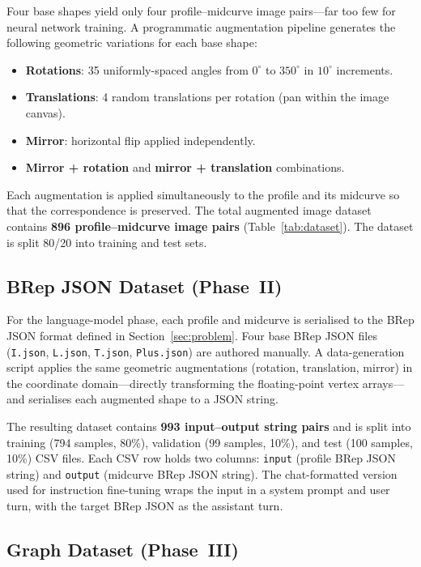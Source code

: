 \documentclass[journal]{IEEEtran}
\begin{document}
Four base shapes yield only four profile--midcurve image pairs—far too few for
neural network training.  A programmatic augmentation pipeline generates the
following geometric variations for each base shape:
\begin{itemize}
  \item \textbf{Rotations}: 35 uniformly-spaced angles from $0^\circ$ to $350^\circ$ in
        $10^\circ$ increments.
  \item \textbf{Translations}: 4 random translations per rotation (pan within
        the image canvas).
  \item \textbf{Mirror}: horizontal flip applied independently.
  \item \textbf{Mirror + rotation} and \textbf{mirror + translation}
        combinations.
\end{itemize}
Each augmentation is applied simultaneously to the profile and its midcurve
so that the correspondence is preserved.  The total augmented image dataset
contains \textbf{896 profile--midcurve image pairs} (Table~\ref{tab:dataset}).
The dataset is split 80/20 into training and test sets.

\subsection{BRep JSON Dataset (Phase~II)}

For the language-model phase, each profile and midcurve is serialised to the
BRep JSON format defined in Section~\ref{sec:problem}.  Four base BRep JSON
files (\texttt{I.json}, \texttt{L.json}, \texttt{T.json}, \texttt{Plus.json})
are authored manually.  A data-generation script applies the same geometric
augmentations (rotation, translation, mirror) in the coordinate domain—directly
transforming the floating-point vertex arrays—and serialises each augmented
shape to a JSON string.

The resulting dataset contains \textbf{993 input--output string pairs} and is
split into training (794 samples, 80\%), validation (99 samples, 10\%), and
test (100 samples, 10\%) CSV files.  Each CSV row holds two columns:
\texttt{input} (profile BRep JSON string) and \texttt{output} (midcurve BRep
JSON string).  The chat-formatted version used for instruction fine-tuning
wraps the input in a system prompt and user turn, with the target BRep JSON as
the assistant turn.

\subsection{Graph Dataset (Phase~III)}
\end{document}
